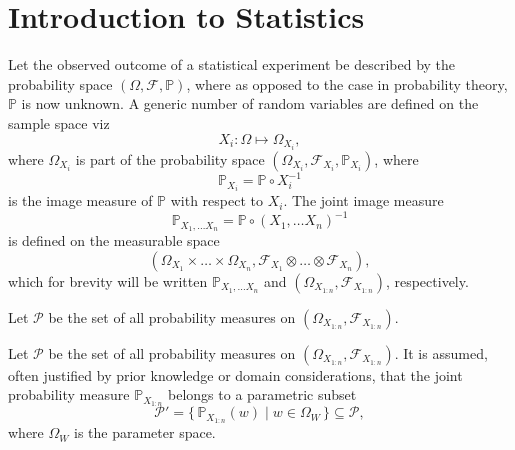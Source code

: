\chapter{Introduction to Statistics}
\label{chp:statistics_introduction}
Let the observed outcome of a statistical experiment be described by the probability space $(\Omega, \mathcal{F}, \mathbb{P})$, where as opposed to the case in probability theory, $\mathbb{P}$ is now unknown. A generic number of random variables are defined on the sample space viz~\cite{orbanz2009functional,tausk2023basic, drewitz2019introduction,chan2021introduction}
\begin{equation}
	X_i: \Omega \mapsto \Omega_{X_i},
\end{equation} 
where $\Omega_{X_i}$ is part of the probability space $(\Omega_{X_i},\mathcal{F}_{X_i},\mathbb{P}_{X_i})$, where
\begin{equation}
	\mathbb{P}_{X_i} = \mathbb{P}\circ X_i^{-1}
\end{equation}
is the image measure of $\mathbb{P}$ with respect to $X_i$. The joint image measure
\begin{equation}
	\mathbb{P}_{X_1,\dots X_n} = \mathbb{P}\circ(X_1,\dots X_n)^{-1}
\end{equation}
is defined on the measurable space 
\begin{equation}
	(\Omega_{X_1}\times \dots\times \Omega_{X_n}, \mathcal{F}_{X_1}\otimes \dots \otimes \mathcal{F}_{X_n}),
\end{equation}
which for brevity will be written $\mathbb{P}_{X_1,\dots X_n}$ and $(\Omega_{X_{1:n}},\mathcal{F}_{X_{1:n}})$, respectively.

\begin{definition}
	Let $\mathcal{P}$ be the set of all probability measures on $(\Omega_{X_{1:n}},\mathcal{F}_{X_{1:n}})$.
\end{definition}

\begin{definition}
	Let $\mathcal{P}$ be the set of all probability measures on $(\Omega_{X_{1:n}},\mathcal{F}_{X_{1:n}})$. It is assumed, often justified by prior knowledge or domain considerations, that the joint probability measure $\mathbb{P}_{X_{1:n}}$ belongs to a parametric subset
	\begin{equation}
		\mathcal{P}' = \{\, \mathbb{P}_{X_{1:n}}(w) \mid w \in \Omega_W \,\} \subseteq \mathcal{P},
	\end{equation}
	where $\Omega_W$ is the parameter space.
\end{definition}

